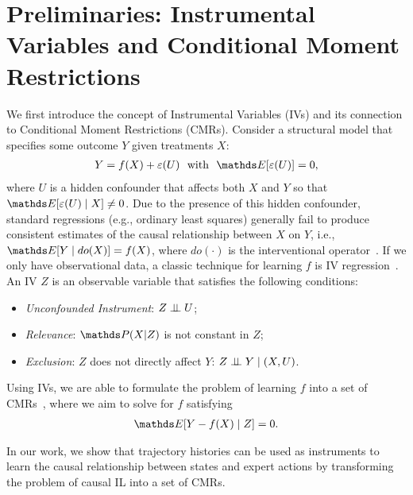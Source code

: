 \section{Preliminaries: Instrumental Variables and Conditional Moment Restrictions}\label{sec:cmr}

We first introduce the concept of Instrumental Variables (IVs) and its connection to Conditional Moment Restrictions (CMRs). Consider a structural model that specifies some outcome $Y$ given treatments $X$: 
\begin{align}
    Y=f(X)+\epsilon(U) \ \text{ with } \  \expectE[\epsilon(U)]=0,\label{eq:iv_reg}
\end{align}
where $U$ is a hidden confounder that affects both $X$ and $Y$ so that $\expectE[\varepsilon(U) \mid X]\neq 0$. Due to the presence of this hidden confounder, standard regressions (e.g., ordinary least squares) generally fail to produce consistent estimates of the causal relationship between $X$ on $Y$, i.e., $\expectE[Y \mid do(X)]=f(X)$, where $do(\cdot)$ is the interventional operator~\citep{Pearl2000}. If we only have observational data, a classic technique for learning $f$ is IV regression~\citep{Newey2003}. An IV $Z$ is an observable variable that satisfies the following conditions: 
\begin{itemize}[leftmargin=10pt, topsep=5pt]
\label{assump:iv}
    \item \textit{Unconfounded Instrument}: $Z\perp \!\!\! \perp U$;
    \item \textit{Relevance}: $\probP(X\lvert Z)$ is not constant in $Z$;
    \item \textit{Exclusion}: $Z$ does not directly affect $Y$: $Z\perp \!\!\! \perp Y \mid (X,U)$.
\end{itemize}

Using IVs, we are able to formulate the problem of learning $f$ into a set of CMRs~\citep{Dikkala2020}, where we aim to solve for $f$ satisfying
\begin{align}
\expectE[Y-f(X)\mid Z]=0.\nonumber
\end{align}

In our work, we show that trajectory histories can be used as instruments to learn the causal relationship between states and expert actions by transforming the problem of causal IL into a set of CMRs.

